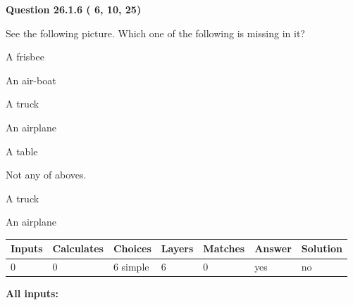 \documentclass[12pt]{article}
\begin{document}
   
  
\vspace{0.2in}
  
{\textbf{\Large{Question
26.1.6 
 (          6,         10,         25)
}}}
  
  
See the following picture.
Which one of the following is missing in it?
 
 
A frisbee
 
 
An air-boat
 
 
A truck
 
 
An airplane
 
 
A table
 
 
  Not any of aboves.
 
 
\noindent{}
 
 
A truck
 
 
An airplane
 
 
\noindent{}
 
 
 
\vspace{0.3in}
   
   
   
   
\noindent\begin{tabular}{|l|l|l|l|l|l|l|}
 \hline
Inputs & Calculates & Choices & Layers & Matches & Answer & Solution \\ \hline
           0 & 
           0 & 
           6
  simple  
  & 
           6 & 
           0 & 
  yes & 
  no 
  \\ \hline
 \end{tabular}
   
   
   
   
\noindent{}
   
   
   
   
\noindent\vspace{0.1in}\hspace{-0.08in} {\textbf{\Large{All inputs: }}}
   
   
   
\end{document}
